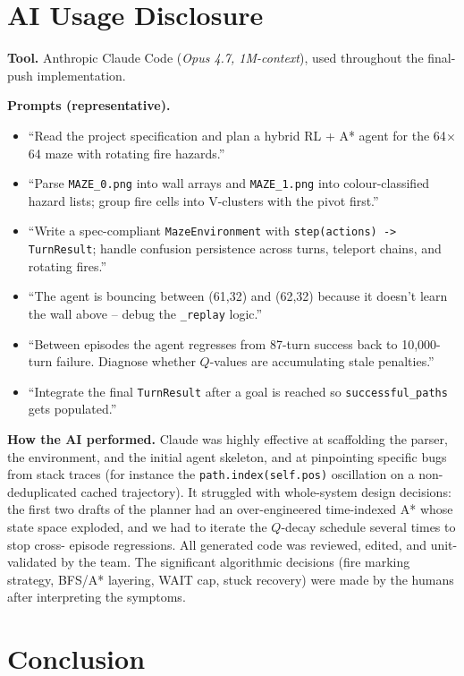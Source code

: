 \documentclass[11pt]{article}
\begin{document}
\section{AI Usage Disclosure}

\textbf{Tool.}  Anthropic Claude Code (\emph{Opus 4.7, 1M-context}),
used throughout the final-push implementation.

\textbf{Prompts (representative).}
\begin{itemize}[itemsep=0.15em]
  \item ``Read the project specification and plan a hybrid RL + A* agent
    for the 64$\times$64 maze with rotating fire hazards.''
  \item ``Parse \texttt{MAZE\_0.png} into wall arrays and
    \texttt{MAZE\_1.png} into colour-classified hazard lists; group fire
    cells into V-clusters with the pivot first.''
  \item ``Write a spec-compliant \texttt{MazeEnvironment} with
    \texttt{step(actions) -> TurnResult}; handle confusion persistence
    across turns, teleport chains, and rotating fires.''
  \item ``The agent is bouncing between (61,32) and (62,32) because it
    doesn't learn the wall above -- debug the \texttt{\_replay} logic.''
  \item ``Between episodes the agent regresses from 87-turn success
    back to 10{,}000-turn failure.  Diagnose whether $Q$-values are
    accumulating stale penalties.''
  \item ``Integrate the final \texttt{TurnResult} after a goal is
    reached so \texttt{successful\_paths} gets populated.''
\end{itemize}

\textbf{How the AI performed.}  Claude was highly effective at
scaffolding the parser, the environment, and the initial agent
skeleton, and at pinpointing specific bugs from stack traces (for
instance the \texttt{path.index(self.pos)} oscillation on a
non-deduplicated cached trajectory).  It struggled with whole-system
design decisions: the first two drafts of the planner had an
over-engineered time-indexed A* whose state space exploded, and we
had to iterate the $Q$-decay schedule several times to stop cross-
episode regressions.  All generated code was reviewed, edited, and
unit-validated by the team.  The significant algorithmic decisions
(fire marking strategy, BFS/A* layering, WAIT cap, stuck recovery)
were made by the humans after interpreting the symptoms.

\section{Conclusion}
\end{document}
